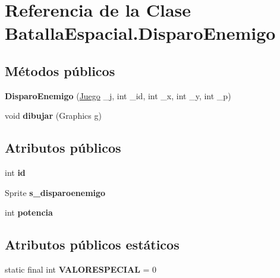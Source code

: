 \hypertarget{classBatallaEspacial_1_1DisparoEnemigo}{
\section{Referencia de la Clase BatallaEspacial.DisparoEnemigo}
\label{classBatallaEspacial_1_1DisparoEnemigo}
}
\subsection*{Métodos públicos}
\begin{DoxyCompactItemize}
\item 
\hypertarget{classBatallaEspacial_1_1DisparoEnemigo_a18d3903cc57df51236ea2d9b8151a3a9}{
{\bfseries DisparoEnemigo} (\hyperlink{classBatallaEspacial_1_1Juego}{Juego} \_\-j, int \_\-id, int \_\-x, int \_\-y, int \_\-p)}
\label{classBatallaEspacial_1_1DisparoEnemigo_a18d3903cc57df51236ea2d9b8151a3a9}

\item 
\hypertarget{classBatallaEspacial_1_1DisparoEnemigo_ab968fbd87083689fa23354e1de28e5d0}{
void {\bfseries dibujar} (Graphics g)}
\label{classBatallaEspacial_1_1DisparoEnemigo_ab968fbd87083689fa23354e1de28e5d0}

\end{DoxyCompactItemize}
\subsection*{Atributos públicos}
\begin{DoxyCompactItemize}
\item 
\hypertarget{classBatallaEspacial_1_1DisparoEnemigo_a38f3bce5400ab2d3f4b9d633cabc2708}{
int {\bfseries id}}
\label{classBatallaEspacial_1_1DisparoEnemigo_a38f3bce5400ab2d3f4b9d633cabc2708}

\item 
\hypertarget{classBatallaEspacial_1_1DisparoEnemigo_a5705b22b162bc3f660d6095e099fa6e1}{
Sprite {\bfseries s\_\-disparoenemigo}}
\label{classBatallaEspacial_1_1DisparoEnemigo_a5705b22b162bc3f660d6095e099fa6e1}

\item 
\hypertarget{classBatallaEspacial_1_1DisparoEnemigo_ab8e51083b11f849dd05ee2f38df34799}{
int {\bfseries potencia}}
\label{classBatallaEspacial_1_1DisparoEnemigo_ab8e51083b11f849dd05ee2f38df34799}

\end{DoxyCompactItemize}
\subsection*{Atributos públicos estáticos}
\begin{DoxyCompactItemize}
\item 
\hypertarget{classBatallaEspacial_1_1DisparoEnemigo_ae905809e028829ab0d3c5e93e4175353}{
static final int {\bfseries VALORESPECIAL} = 0}
\label{classBatallaEspacial_1_1DisparoEnemigo_ae905809e028829ab0d3c5e93e4175353}

\end{DoxyCompactItemize}
